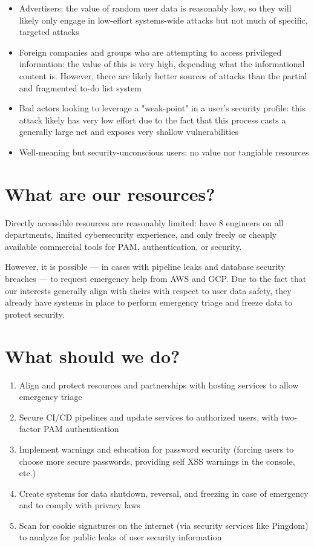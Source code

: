 \documentclass[letterpaper]{article}
\begin{document}
\begin{itemize}
\item Advertisers: the value of random user data is reasonably low, so they will likely only engage in low-effort systems-wide attacks but not much of specific, targeted attacks
\item Foreign companies and groups who are attempting to access privileged information: the value of this is very high, depending what the informational content is. However, there are likely better sources of attacks than the partial and fragmented to-do list system
\item Bad actors looking to leverage a "weak-point" in a user's security profile: this attack likely has very low effort due to the fact that this process casts a generally large net and exposes very shallow vulnerabilities
\item Well-meaning but security-unconscious users: no value nor tangiable resources
\end{itemize}

\section{What are our resources?}
\label{sec:org2fe6bd5}
Directly accessible resources are reasonably limited: have 8 engineers on all departments, limited cybersecurity experience, and only freely or cheaply available commercial tools for PAM, authentication, or security.

However, it is possible --- in cases with pipeline leaks and database security breaches --- to request emergency help from AWS and GCP. Due to the fact that our interests generally align with theirs with respect to user data safety, they already have systems in place to perform emergency triage and freeze data to protect security.

\section{What should we do?}
\label{sec:org09820cb}
\begin{enumerate}
\item Align and protect resources and partnerships with hosting services to allow emergency triage
\item Secure CI/CD pipelines and update services to authorized users, with two-factor PAM authentication
\item Implement warnings and education for password security (forcing users to choose more secure passwords, providing self XSS warnings in the console, etc.)
\item Create systems for data shutdown, reversal, and freezing in case of emergency and to comply with privacy laws
\item Scan for cookie signatures on the internet (via security services like Pingdom) to analyze for public leaks of user security information
\end{enumerate}
\end{document}
